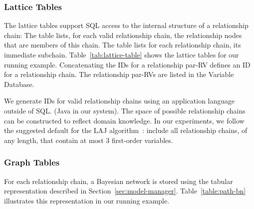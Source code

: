 \subsubsection{Lattice Tables}

The lattice tables support SQL access to the internal structure of a relationship chain: The  table lists, for each valid relationship chain, the relationship nodes that are members of this chain. The  table lists for each relationship chain, its immediate subchain. Table~\ref{tab:lattice-table} shows the lattice tables for our running example. %
Concatenating the IDs for a relationship par-RV defines an ID for a relationship chain. The relationship par-RVs are listed in the Variable Database. 

We generate IDs for valid relationship chains using an application language outside of SQL. (Java in our system). The space of possible relationship chains can be constructed to reflect domain knowledge. In our experiments, we follow the suggested default for the LAJ algorithm~\cite{Schulte2012}: include all relationship chains, of any length, that contain at most 3 first-order variables.

\subsubsection{Graph Tables}

For each relationship chain, a Bayesian network is stored using the tabular representation described in Section~\ref{sec:model-manager}. Table~\ref{table:path-bn} illustrates this representation in our running example.



